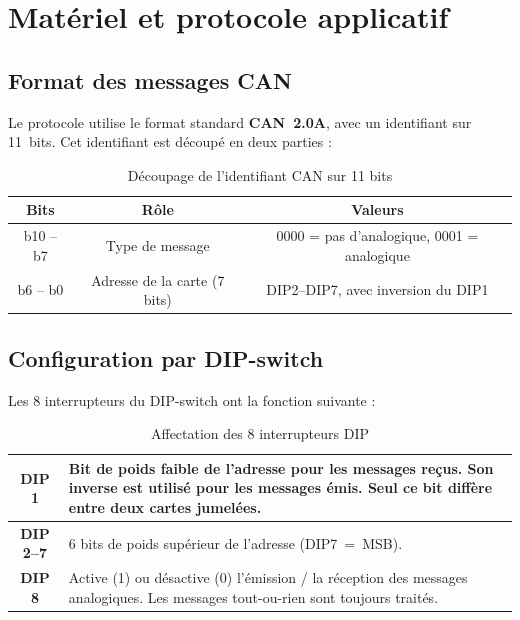 \section{Matériel et protocole applicatif}

\subsection{Format des messages CAN}

Le protocole utilise le format standard \textbf{CAN~2.0A}, avec un
identifiant sur 11~bits. Cet identifiant est découpé en deux parties :

\begin{table}[H]
\centering
\begin{tabular}{|c|c|c|}
\hline
Bits & Rôle & Valeurs \\
\hline
b10 -- b7 & Type de message & 0000 = pas d'analogique, 0001 = analogique \\
\hline
b6 -- b0 & Adresse de la carte (7 bits) & DIP2--DIP7, avec inversion du DIP1 \\
\hline
\end{tabular}
\caption{Découpage de l'identifiant CAN sur 11 bits}
\end{table}

\subsection{Configuration par DIP-switch}

Les 8 interrupteurs du DIP-switch ont la fonction suivante :

\begin{table}[H]
\centering
\begin{tabular}{|c|p{11cm}|}
\hline
\textbf{DIP 1} & Bit de poids faible de l'adresse pour les messages
reçus. Son inverse est utilisé pour les messages émis.
Seul ce bit diffère entre deux cartes jumelées. \\
\hline
\textbf{DIP 2--7} & 6 bits de poids supérieur de l'adresse (DIP7~=~MSB). \\
\hline
\textbf{DIP 8} & Active (1) ou désactive (0) l'émission / la réception des
messages analogiques. Les messages tout-ou-rien sont toujours traités. \\
\hline
\end{tabular}
\caption{Affectation des 8 interrupteurs DIP}
\end{table}



